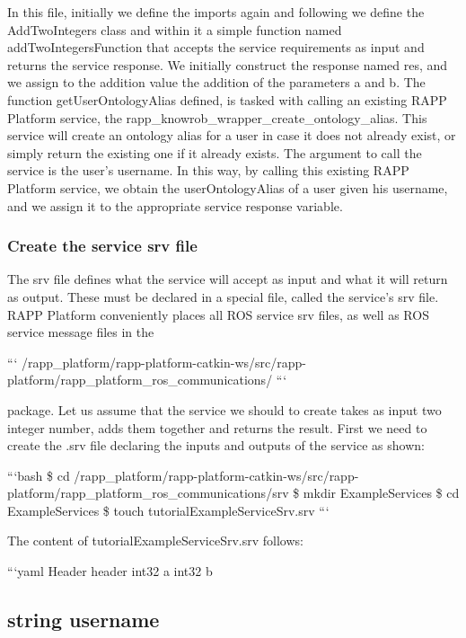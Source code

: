 In this file, initially we define the imports again and following we define the Add\-Two\-Integers class and within it a simple function named add\-Two\-Integers\-Function that accepts the service requirements as input and returns the service response. We initially construct the response named res, and we assign to the addition value the addition of the parameters a and b. The function get\-User\-Ontology\-Alias defined, is tasked with calling an existing R\-A\-P\-P Platform service, the {\ttfamily rapp\-\_\-knowrob\-\_\-wrapper\-\_\-create\-\_\-ontology\-\_\-alias}. This service will create an ontology alias for a user in case it does not already exist, or simply return the existing one if it already exists. The argument to call the service is the user's username. In this way, by calling this existing R\-A\-P\-P Platform service, we obtain the user\-Ontology\-Alias of a user given his username, and we assign it to the appropriate service response variable.

\subsubsection*{Create the service srv file}

The srv file defines what the service will accept as input and what it will return as output. These must be declared in a special file, called the service's srv file. R\-A\-P\-P Platform conveniently places all R\-O\-S service srv files, as well as R\-O\-S service message files in the

``` /rapp\-\_\-platform/rapp-\/platform-\/catkin-\/ws/src/rapp-\/platform/rapp\-\_\-platform\-\_\-ros\-\_\-communications/ ```

package. Let us assume that the service we should to create takes as input two integer number, adds them together and returns the result. First we need to create the .srv file declaring the inputs and outputs of the service as shown\-:

```bash \$ cd /rapp\-\_\-platform/rapp-\/platform-\/catkin-\/ws/src/rapp-\/platform/rapp\-\_\-platform\-\_\-ros\-\_\-communications/srv \$ mkdir Example\-Services \$ cd Example\-Services \$ touch tutorial\-Example\-Service\-Srv.\-srv ```

The content of {\ttfamily tutorial\-Example\-Service\-Srv.\-srv} follows\-:

```yaml Header header int32 a int32 b \subsection*{string username }

